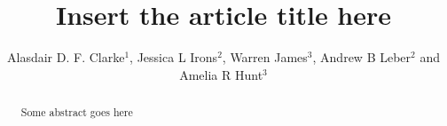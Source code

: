 \documentclass[]{rsos}%
\begin{document}
\title{Insert the article title here}

\author{%
Alasdair D. F. Clarke$^1$, Jessica L Irons$^2$, Warren James$^3$, Andrew B Leber$^2$ and Amelia R Hunt$^3$}

\address{$^{1}$Department of Psychology, University of Essex, Colchester, UK\\
$^{2}$Department of Psychology, The Ohio State University, Columbus, USA\\
$^{3}$School of Psychology, University of Aberdeen, Aberdeen, UK}

\subject{Behaviour, evolution}



\begin{abstract}
Some abstract goes here
\end{abstract}

\end{document}
